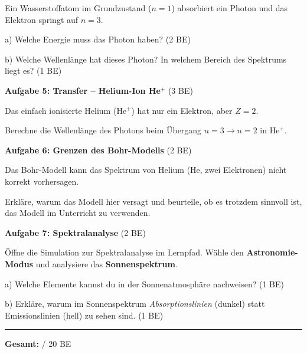 \documentclass[11pt,a4paper]{article}
\begin{document}
Ein Wasserstoffatom im Grundzustand ($n = 1$) absorbiert ein Photon und das Elektron springt auf $n = 3$.

a) Welche Energie muss das Photon haben? (2 BE)

\vspace{1.5cm}

b) Welche Wellenlänge hat dieses Photon? In welchem Bereich des Spektrums liegt es? (1 BE)

\vspace{1.5cm}


\textbf{Aufgabe 5: Transfer -- Helium-Ion He$^+$} \hfill (3 BE)

Das einfach ionisierte Helium (He$^+$) hat nur ein Elektron, aber $Z = 2$.

Berechne die Wellenlänge des Photons beim Übergang $n = 3 \to n = 2$ in He$^+$.

\vspace{3.5cm}


\textbf{Aufgabe 6: Grenzen des Bohr-Modells} \hfill (2 BE)

Das Bohr-Modell kann das Spektrum von Helium (He, zwei Elektronen) nicht korrekt vorhersagen.

Erkläre, warum das Modell hier versagt und beurteile, ob es trotzdem sinnvoll ist, das Modell im Unterricht zu verwenden.

\vspace{2.5cm}


\textbf{Aufgabe 7: Spektralanalyse} \hfill (2 BE)

Öffne die Simulation zur Spektralanalyse im Lernpfad. Wähle den \textbf{Astronomie-Modus} und analysiere das \textbf{Sonnenspektrum}.

\vspace{0.5em}

a) Welche Elemente kannst du in der Sonnenatmosphäre nachweisen? (1 BE)

\vspace{1.5cm}

b) Erkläre, warum im Sonnenspektrum \emph{Absorptionslinien} (dunkel) statt Emissionslinien (hell) zu sehen sind. (1 BE)

\vspace{2cm}

\vfill

\begin{center}
\rule{10cm}{0.5pt}

\textbf{Gesamt:} \underline{\hspace{1cm}} / 20 BE
\end{center}
\end{document}
